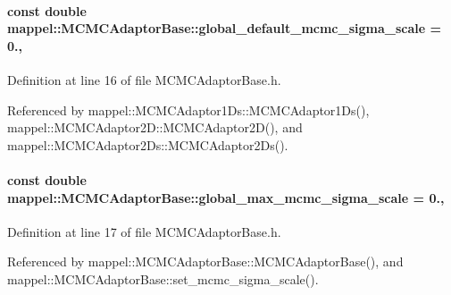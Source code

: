 \paragraph[{\texorpdfstring{global\+\_\+default\+\_\+mcmc\+\_\+sigma\+\_\+scale}{global_default_mcmc_sigma_scale}}]{\setlength{\rightskip}{0pt plus 5cm}const double mappel\+::\+M\+C\+M\+C\+Adaptor\+Base\+::global\+\_\+default\+\_\+mcmc\+\_\+sigma\+\_\+scale = 0.\hspace{0.3cm}{\ttfamily [static]}, {\ttfamily [inherited]}}\hypertarget{classmappel_1_1MCMCAdaptorBase_a44cebca0e27135c854fa8430d2d89929}{}\label{classmappel_1_1MCMCAdaptorBase_a44cebca0e27135c854fa8430d2d89929}


Definition at line 16 of file M\+C\+M\+C\+Adaptor\+Base.\+h.



Referenced by mappel\+::\+M\+C\+M\+C\+Adaptor1\+Ds\+::\+M\+C\+M\+C\+Adaptor1\+Ds(), mappel\+::\+M\+C\+M\+C\+Adaptor2\+D\+::\+M\+C\+M\+C\+Adaptor2\+D(), and mappel\+::\+M\+C\+M\+C\+Adaptor2\+Ds\+::\+M\+C\+M\+C\+Adaptor2\+Ds().

\paragraph[{\texorpdfstring{global\+\_\+max\+\_\+mcmc\+\_\+sigma\+\_\+scale}{global_max_mcmc_sigma_scale}}]{\setlength{\rightskip}{0pt plus 5cm}const double mappel\+::\+M\+C\+M\+C\+Adaptor\+Base\+::global\+\_\+max\+\_\+mcmc\+\_\+sigma\+\_\+scale = 0.\hspace{0.3cm}{\ttfamily [static]}, {\ttfamily [inherited]}}\hypertarget{classmappel_1_1MCMCAdaptorBase_aebc93881ca351e67de867238a62579eb}{}\label{classmappel_1_1MCMCAdaptorBase_aebc93881ca351e67de867238a62579eb}


Definition at line 17 of file M\+C\+M\+C\+Adaptor\+Base.\+h.



Referenced by mappel\+::\+M\+C\+M\+C\+Adaptor\+Base\+::\+M\+C\+M\+C\+Adaptor\+Base(), and mappel\+::\+M\+C\+M\+C\+Adaptor\+Base\+::set\+\_\+mcmc\+\_\+sigma\+\_\+scale().

